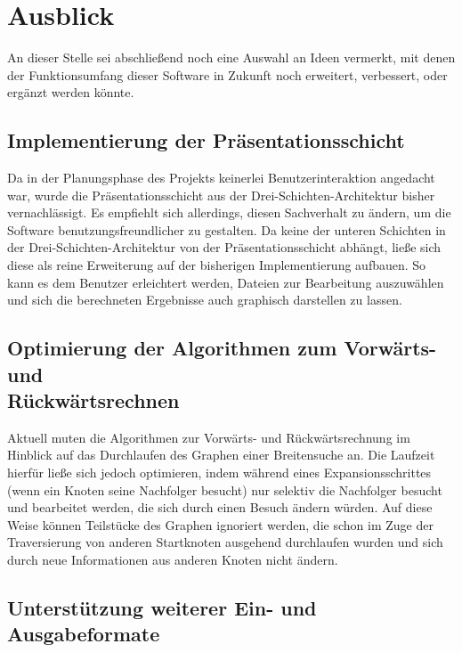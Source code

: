 \chapter{Ausblick}
\label{Ausblick}

An dieser Stelle sei abschlie{\ss}end noch eine Auswahl an Ideen
vermerkt, mit denen der
Funktionsumfang dieser Software in Zukunft noch erweitert, verbessert,
oder erg\"anzt werden k\"onnte.

\section{Implementierung der Pr\"asentationsschicht}

Da in der Planungsphase des Projekts keinerlei Benutzerinteraktion
angedacht war, wurde die Pr\"asentationsschicht aus der
Drei-Schichten-Architektur bisher vernachl\"assigt. Es empfiehlt sich
allerdings, diesen Sachverhalt zu \"andern, um die Software
benutzungsfreundlicher zu gestalten. Da keine der unteren Schichten in
der Drei-Schichten-Architektur von der Pr\"asentationsschicht
abh\"angt, lie{\ss}e sich diese als reine Erweiterung
auf der bisherigen Implementierung aufbauen. So kann es dem Benutzer
erleichtert werden, Dateien zur Bearbeitung auszuw\"ahlen und sich die
berechneten Ergebnisse auch graphisch darstellen zu lassen.

\section{Optimierung der Algorithmen zum Vorw\"arts- und\\
  R\"uckw\"artsrechnen}

Aktuell muten die Algorithmen zur Vorw\"arts- und
R\"uckw\"artsrechnung im Hinblick auf das Durchlaufen des Graphen
einer Breitensuche an. Die Laufzeit hierf\"ur lie{\ss}e sich jedoch
optimieren, indem w\"ahrend eines Expansionsschrittes (wenn ein Knoten
seine Nachfolger besucht) nur selektiv die Nachfolger besucht und
bearbeitet werden, die sich durch einen Besuch \"andern w\"urden.
Auf diese Weise k\"onnen Teilst\"ucke des Graphen ignoriert werden,
die schon im Zuge der Traversierung von anderen Startknoten ausgehend
durchlaufen wurden und sich durch neue Informationen aus anderen
Knoten nicht \"andern.

\section{Unterst\"utzung weiterer Ein- und Ausgabeformate}

